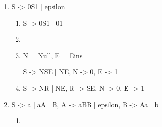 \documentclass{bschlangaul-aufgabe}
\begin{document}
\begin{enumerate}


\item

\begin{bProduktionsRegeln}
S -> 0S1 | epsilon
\end{bProduktionsRegeln}

\begin{bAntwort}
\begin{enumerate}
\item {}

\begin{bProduktionsRegeln}
S -> 0S1 | 01
\end{bProduktionsRegeln}
\item {}

\bNichtsZuTun

\item {}

N = Null, E = Eins

\begin{bProduktionsRegeln}
S -> NSE | NE,
N -> 0,
E -> 1
\end{bProduktionsRegeln}

\item {}

\begin{bProduktionsRegeln}
S -> NR | NE,
R -> SE,
N -> 0,
E -> 1
\end{bProduktionsRegeln}
\end{enumerate}
\end{bAntwort}


\item

\begin{bProduktionsRegeln}
S -> a | aA | B,
A -> aBB | epsilon,
B -> Aa | b
\end{bProduktionsRegeln}

\begin{bAntwort}
\begin{enumerate}
\item {}


\end{enumerate}
\end{bAntwort}
\end{enumerate}
\end{document}
